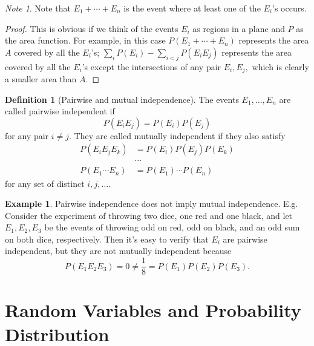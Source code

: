 \documentclass[12pt]{article}
\theoremstyle{plain}
\theoremstyle{definition}
\newtheorem{definition}[theorem]{Definition}
\newtheorem{example}[theorem]{Example}
\theoremstyle{remark}
\newtheorem{note}[theorem]{Note}
\begin{document}
\begin{note}
  Note that $ E_1 + \cdots + E_n $ is the event where at least one of the $ E_i $'s occurs.
\end{note}

\begin{proof}
This is obvious if we think of the events $ E_i $ as regions in a plane and $ P $ as the area function. For example, in this case $ P(E_1 + \cdots + E_n) $ represents the area $A$ covered by all the $ E_i $'s; $ \sum_i P(E_i) - \sum_{i<j} P(E_i E_j) $ represents the area covered by all the $ E_i $'s except the intersections of any pair $ E_i, E_j, $ which is clearly a smaller area than $A.$
\end{proof}

\begin{definition}[Pairwise and mutual independence]
  The events $ E_1, \ldots, E_n $ are called pairwise independent if $$
    P(E_i E_j) = P(E_i) P(E_j)
  $$ for any pair $ i \neq j. $ They are called mutually independent if they also satisfy
    \begin{align*}
      P(E_i E_j E_k) &= P(E_i) P(E_j) P(E_k) \\
      &\cdots \\
      P(E_1 \cdots E_n) &= P(E_1) \cdots P(E_n)
    \end{align*}
  for any set of distinct $ i, j, \ldots. $
\end{definition}

\begin{example}
  Pairwise independence does not imply mutual independence. E.g. Consider the
  experiment of throwing two dice, one red and one black, and let $ E_1, E_2,
  E_3 $ be the events of throwing odd on red, odd on black, and an odd sum on
  both dice, respectively. Then it's easy to verify that $ E_i $ are pairwise independent, but they are not mutually independent because $$
    P(E_1 E_2 E_3) = 0 \neq \frac{1}{8} = P(E_1) P(E_2) P(E_3).
  $$
\end{example}

\section{Random Variables and Probability Distribution}
\end{document}
